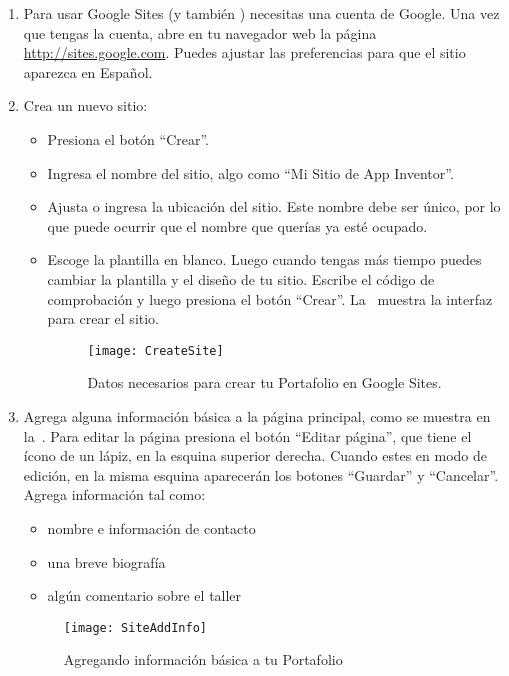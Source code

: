 \begin{enumerate}

\item Para usar Google Sites (y también \AppInventor) necesitas una
  cuenta de Google. Una vez que tengas la cuenta, abre en tu navegador
  web la página \url{http://sites.google.com}. Puedes ajustar las
  preferencias para que el sitio aparezca en Español.

\item Crea un nuevo sitio:

  \begin{itemize}
  \item Presiona el botón ``Crear''.
  \item Ingresa el nombre del sitio, algo como ``Mi Sitio de App
    Inventor''.
  \item Ajusta o ingresa la ubicación del sitio. Este nombre debe ser
    único, por lo que puede ocurrir que el nombre que querías ya esté
    ocupado. 
  \item Escoge la plantilla en blanco. Luego cuando tengas más tiempo
    puedes cambiar la plantilla y el diseño de tu sitio. Escribe el
    código de comprobación y luego presiona el botón
    ``Crear''. La~ muestra la interfaz para crear
    el sitio.

\begin{figure}[H]
\centering
\texttt{[image: CreateSite]}
\caption{Datos necesarios para crear tu Portafolio en Google Sites.}
\label{fig:createSite}
\end{figure}
    
  \end{itemize}

\item Agrega alguna información básica a la página principal, como se
  muestra en la~. Para editar la página presiona
  el botón ``Editar página'', que tiene el ícono de un lápiz, en la
  esquina superior derecha. Cuando estes en modo de edición, en la
  misma esquina aparecerán los botones ``Guardar'' y
  ``Cancelar''. Agrega información tal como:

  \begin{itemize}
  \item nombre e información de contacto
  \item una breve biografía
  \item algún comentario sobre el taller
  \end{itemize}

\begin{figure}[H]
\centering
\texttt{[image: SiteAddInfo]}
\caption{Agregando información básica a tu Portafolio}
\label{fig:SiteAddInfo}
\end{figure}


\end{enumerate}
